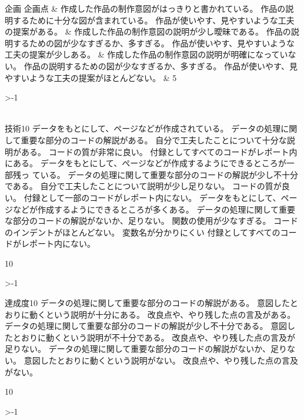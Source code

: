 \documentclass[a4j]{jreport}
\newcommand{\TargetF}[6]{%
	\ifx\relax#1\else
	#1{\small \hspace*{-0.2em}\newline#2点}%
	&\ShowItem#3\relax  %
	&\ShowItem#4\relax
	&\ShowItem#5\relax
	&#6%
	\\ \hline\expandafter\TargetF\fi}
\newcommand{\Cent}[1]{\hspace*{\fill}#1\hspace*{\fill}\rule{0em}{1ex}}
\newcommand{\PointsV}{\ShowNo{5}{1}}
\newcommand{\PointsX}{\ShowNo{10}{1}}
\newcounter{NN}
\newcounter{STEP}
\newcommand{\ShowNo}[2]{%
  \setcounter{NN}{#1}\setcounter{STEP}{-#2}\Cent{#1}\ShowNoDo}
\newcommand{\ShowNoDo}{%
  \addtocounter{NN}{\value{STEP}}\ifnum\value{NN}>-1\newline\Cent{\arabic{NN}}%
  \expandafter\ShowNoDo\fi
}
\begin{document}
\newpage
{}
{\TargetF{企画}{5}
{
  {作成した作品の制作意図がはっきりと書かれている。}
  {作品の説明するために十分な図が含まれている。}
	{作品が使いやす、見やすいような工夫の提案がある。}
}
{
  {作成した作品の制作意図の説明が少し曖昧である。}
  {作品の説明するための図が少なすぎるか、多すぎる。}
	{作品が使いやす、見やすいような工夫の提案が少しある。}
}
{
  {作成した作品の制作意図の説明が明確になっていない。}
  {作品の説明するための図が少なすぎるか、多すぎる。}
	{作品が使いやす、見やすいような工夫の提案がほとんどない。}
}
{\PointsV}
{技術}{10}
{
  {データをもとにして、ページなどが作成されている。}
  {データの処理に関して重要な部分のコードの解説がある。}
	{自分で工夫したことについて十分な説明がある。}
	{コードの質が非常に良い。}
  {付録としてすべてのコードがレポート内にある。}
}
{
  {データをもとにして、ページなどが作成するようにできるところが一部残っ
	ている。}
  {データの処理に関して重要な部分のコードの解説が少し不十分である。}
	{自分で工夫したことについて説明が少し足りない。}
	{コードの質が良い。}
  {付録として一部のコードがレポート内にない。}
}
{
  {データをもとにして、ページなどが作成するようにできるところが多くある。}
  {データの処理に関して重要な部分のコードの解説がないか、足りない。}
	{関数の使用が少なすぎる。}
	{コードのインデントがほとんどない。}
	{変数名が分かりにくい}
  {付録としてすべてのコードがレポート内にない。}
}
{\PointsX}
{達成度}{10}
{
  {データの処理に関して重要な部分のコードの解説がある。}
  {意図したとおりに動くという説明が十分にある。}
	{改良点や、やり残した点の言及がある。}
}
{
  {データの処理に関して重要な部分のコードの解説が少し不十分である。}
  {意図したとおりに動くという説明が不十分である。}
	{改良点や、やり残した点の言及が足りない。}
}
{
  {データの処理に関して重要な部分のコードの解説がないか、足りない。}
  {意図したとおりに動くという説明がない。}
	{改良点や、やり残した点の言及がない。}
}
{\ShowNo{10}{1}}
\relax\relax\relax\relax\relax\relax}
\newpage
\end{document}
